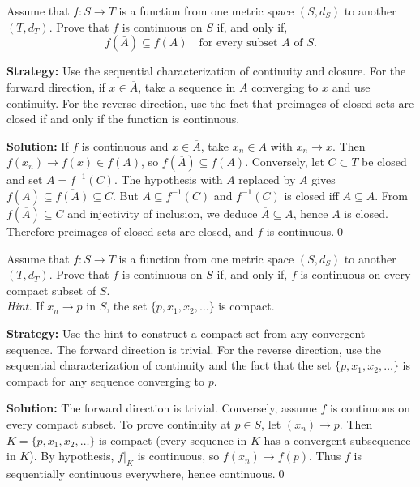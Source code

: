 \begin{problembox}
Assume that $f : S \rightarrow T$ is a function from one metric space $(S, d_S)$ to another $(T, d_T)$. Prove that $f$ is continuous on $S$ if, and only if,
\[ f(\bar{A}) \subseteq \overline{f(A)} \quad \text{for every subset } A \text{ of } S. \]
\end{problembox}

\noindent\textbf{Strategy:} Use the sequential characterization of continuity and closure. For the forward direction, if $x \in \overline{A}$, take a sequence in $A$ converging to $x$ and use continuity. For the reverse direction, use the fact that preimages of closed sets are closed if and only if the function is continuous.

\bigskip\noindent\textbf{Solution:}
If $f$ is continuous and $x\in\overline{A}$, take $x_n\in A$ with $x_n\to x$. Then $f(x_n)\to f(x)\in\overline{f(A)}$, so $f(\overline{A})\subseteq\overline{f(A)}$. Conversely, let $C\subset T$ be closed and set $A=f^{-1}(C)$. The hypothesis with $A$ replaced by $A$ gives $f(\overline{A})\subseteq\overline{f(A)}\subseteq C$. But $A\subseteq f^{-1}(C)$ and $f^{-1}(C)$ is closed iff $\overline{A}\subseteq A$. From $f(\overline{A})\subseteq C$ and injectivity of inclusion, we deduce $\overline{A}\subseteq A$, hence $A$ is closed. Therefore preimages of closed sets are closed, and $f$ is continuous.\qed



\begin{problembox}
Assume that $f : S \rightarrow T$ is a function from one metric space $(S, d_S)$ to another $(T, d_T)$. Prove that $f$ is continuous on $S$ if, and only if, $f$ is continuous on every compact subset of $S$. \\
\textit{Hint.} If $x_n \rightarrow p$ in $S$, the set $\{p, x_1, x_2, \ldots\}$ is compact.
\end{problembox}

\noindent\textbf{Strategy:} Use the hint to construct a compact set from any convergent sequence. The forward direction is trivial. For the reverse direction, use the sequential characterization of continuity and the fact that the set $\{p, x_1, x_2, \ldots\}$ is compact for any sequence converging to $p$.

\bigskip\noindent\textbf{Solution:}
The forward direction is trivial. Conversely, assume $f$ is continuous on every compact subset. To prove continuity at $p\in S$, let $(x_n)\to p$. Then $K=\{p,x_1,x_2,\ldots\}$ is compact (every sequence in $K$ has a convergent subsequence in $K$). By hypothesis, $f|_K$ is continuous, so $f(x_n)\to f(p)$. Thus $f$ is sequentially continuous everywhere, hence continuous.\qed



